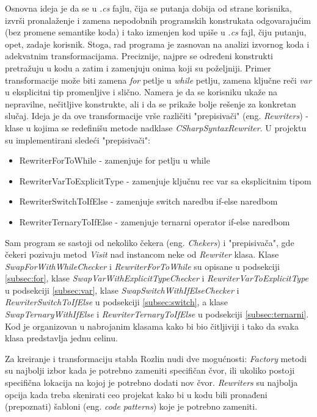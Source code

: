 \documentclass[a4paper]{article}
\begin{document}
{Osnovna ideja je da se u \textit{.cs} fajlu, čija se putanja dobija od strane korisnika, izvrši pronalaženje i zamena nepodobnih programskih konstrukata odgovarajućim (bez promene semantike koda) i tako izmenjen kod upiše u \textit{.cs} fajl, čiju putanju, opet, zadaje korisnik. Stoga, rad programa je zasnovan na analizi izvornog koda i adekvatnim transformacijama. Preciznije, najpre se određeni konstrukti pretražuju u kodu a zatim i zamenjuju onima koji su poželjniji. Primer transformacije može biti zamena \textit{for} petlje u \textit{while} petlju, zamena ključne reči \textit{var} u eksplicitni tip promenljive i slično. Namera je da se korisniku ukaže na nepravilne, nečitljive konstrukte, ali i da se prikaže bolje rešenje za konkretan slučaj. Ideja je da ove transformacije vrše različiti "prepisivači" (eng. \textit{Rewriters}) - klase u kojima se redefinišu metode nadklase \textit{CSharpSyntaxRewriter}. U projektu su implementirani sledeći "prepisivači":
\begin{itemize}
\item RewriterForToWhile - zamenjuje for petlju u while
\item RewriterVarToExplicitType - zamenjuje ključnu rec var sa eksplicitnim tipom
\item RewriterSwitchToIfElse - zamenjuje switch naredbu if-else naredbom
\item RewriterTernaryToIfElse - zamenjuje ternarni operator if-else naredbom
\end{itemize}

Sam program se sastoji od nekoliko čekera (eng. \textit{Chekers}) i "prepisivača", gde čekeri pozivaju metod \textit{Visit} nad instancom neke od \textit{Rewriter} klasa. Klase \textit{SwapForWithWhileChecker} i \textit{RewriterForToWhile} su opisane u podsekciji \ref{subsec:for}, klase \textit{SwapVarWithExplicitTypeChecker} i \textit{RewriterVarToExplicitType} u podsekciji \ref{subsec:var}, klase \textit{SwapSwitchWithIfElseChecker} i \textit{RewriterSwitchToIfElse} u podsekciji \ref{subsec:switch}, a klase \textit{SwapTernaryWithIfElse} i \textit{RewriterTernaryToIfElse} u podsekciji \ref{subsec:ternarni}. Kod je organizovan u nabrojanim klasama kako bi bio čitljiviji i tako da svaka klasa predstavlja jednu celinu.

Za kreiranje i transformaciju stabla Rozlin nudi dve mogućnosti: \textit{Factory} metodi su najbolji izbor kada je potrebno zameniti specifičan čvor, ili ukoliko postoji specifična lokacija na kojoj je potrebno dodati nov čvor. \textit{Rewriters} su najbolja opcija kada treba skenirati ceo projekat kako bi u kodu bili pronađeni (prepoznati) šabloni (eng. \textit{code patterns}) koje je potrebno zameniti.

}
\end{document}
